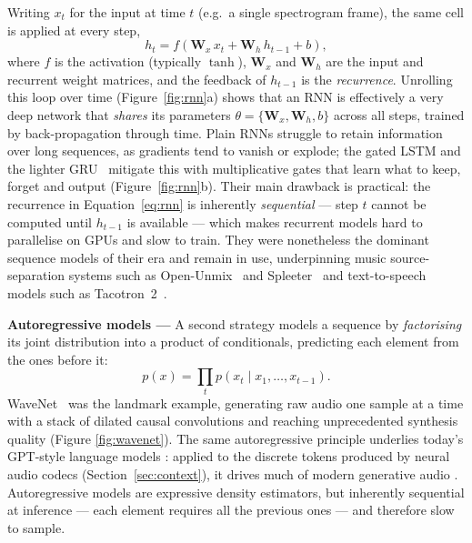 Writing $x_t$ for the input at time $t$ (e.g.\ a
single spectrogram frame), the same cell is applied at every step,
\begin{equation}
    h_t = f\!\left(\mathbf{W}_x\, x_t + \mathbf{W}_h\, h_{t-1} + b\right),
    \label{eq:rnn}
\end{equation}
where $f$ is the activation (typically $\tanh$), $\mathbf{W}_x$ and
$\mathbf{W}_h$ are the input and recurrent weight matrices, and the
feedback of $h_{t-1}$ is the \emph{recurrence}. Unrolling this loop over
time (Figure~\ref{fig:rnn}a) shows that an \acrshort{RNN} is effectively a
very deep network that \emph{shares} its parameters
$\theta = \{\mathbf{W}_x, \mathbf{W}_h, b\}$ across all steps, trained by
back-propagation through time. Plain \acrshort{RNN}s struggle to retain
information over long sequences, as gradients tend to vanish or explode;
the gated \acrfull{LSTM} \citep{hochreiter1997long} and the lighter
\acrfull{GRU}~\citep{cho2014learning} mitigate this with multiplicative
gates that learn what to keep, forget and output (Figure~\ref{fig:rnn}b).
Their main drawback is practical: the recurrence in
Equation~\ref{eq:rnn} is inherently \emph{sequential} --- step $t$ cannot
be computed until $h_{t-1}$ is available --- which makes recurrent models
hard to parallelise on \acrshort{GPU}s and slow to train. They were
nonetheless the dominant sequence models of their era and remain in use,
underpinning music source-separation systems such as Open-Unmix~\citep{stoter2019openunmix} and Spleeter~\citep{hennequin2020spleeter} and
text-to-speech models such as Tacotron~2~\citep{shen2018natural}.



\textbf{Autoregressive models ---} A second strategy models a sequence by
\emph{factorising} its joint distribution into a product of conditionals,
predicting each element from the ones before it:
\begin{equation}
    p(x) = \prod_{t} p\!\left(x_t \mid x_{1}, \dots, x_{t-1}\right).
    \label{eq:autoregressive}
\end{equation}
WaveNet~\citep{van2016wavenet} was the landmark example, generating raw
audio one sample at a time with a stack of dilated causal convolutions and
reaching unprecedented synthesis quality (Figure \ref{fig:wavenet}). The same autoregressive
principle underlies today's GPT-style language models
\citep{radford2019language}: applied to the discrete tokens produced by
neural audio codecs (Section~\ref{sec:context}), it drives much of modern
generative audio \citep{borsos2023audiolm}. Autoregressive models are
expressive density estimators, but inherently sequential at inference ---
each element requires all the previous ones --- and therefore slow to
sample.

